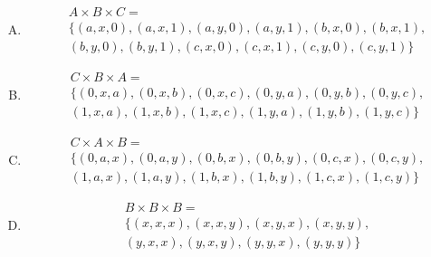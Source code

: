 {{        %
        \begin{practices}
            \begin{enumerate}[A.]
                \item
                {
                    \begin{align*}
                        &A \times B \times C = \\
                        &\{(a, x, 0), (a, x, 1), (a, y, 0), (a, y, 1), (b, x, 0), (b, x, 1), \\
                        &(b, y, 0), (b, y, 1), (c, x, 0), (c, x, 1), (c, y, 0), (c, y, 1)\}
                    \end{align*}
                }
                \item
                {
                    \begin{align*}
                        &C \times B \times A = \\
                        &\{(0, x, a), (0, x, b), (0, x, c), (0, y, a), (0, y, b), (0, y, c), \\
                        &(1, x, a), (1, x, b), (1, x, c), (1, y, a), (1, y, b), (1, y, c)\}
                    \end{align*}
                }
                \item
                {
                    \begin{align*}
                        &C \times A \times B = \\
                        &\{(0, a, x), (0, a, y), (0, b, x), (0, b, y), (0, c, x), (0, c, y), \\
                        &(1, a, x), (1, a, y), (1, b, x), (1, b, y), (1, c, x), (1, c, y)\}
                    \end{align*}
                }
                \item
                {
                    \begin{align*}
                        &B \times B \times B = \\
                        &\{(x, x, x), (x, x, y), (x, y, x), (x, y, y), \\
                        &(y, x, x), (y, x, y), (y, y, x), (y, y, y)\}
                    \end{align*}
                }
            \end{enumerate}
        \end{practices}

}}

